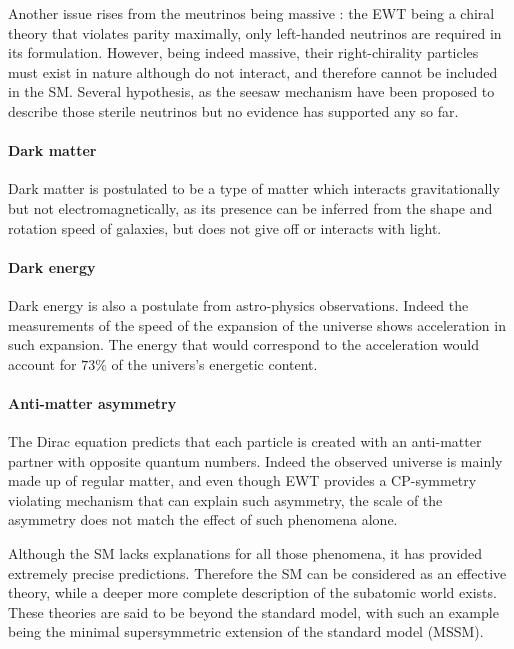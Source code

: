 Another issue rises from the meutrinos being massive : the EWT being a chiral theory that violates parity maximally, only left-handed neutrinos are required in its formulation. However, being indeed massive, their right-chirality particles must exist in nature although do not interact, and therefore cannot be included in the SM. Several hypothesis, as the seesaw mechanism \cite{PhysRevD.22.2227,PhysRevLett.60.1813,PhysRevD.23.165,PhysRevLett.44.912,GellMann:1980vs,MINKOWSKI1977421} have been proposed to describe those sterile neutrinos but no evidence has supported any so far.

\paragraph{Dark matter} Dark matter is postulated to be a type of matter which interacts gravitationally but not electromagnetically, as its presence can be inferred from the shape and rotation speed of galaxies, but does not give off or interacts with light.

\paragraph{Dark energy} Dark energy is also a postulate from astro-physics observations. Indeed the measurements of the speed of the expansion of the universe shows acceleration in such expansion. The energy that would correspond to the acceleration would account for $73\%$ of the univers's energetic content. 

\paragraph{Anti-matter asymmetry} The Dirac equation predicts that each particle is created with an anti-matter partner with opposite quantum numbers. Indeed the observed universe is mainly made up of regular matter, and even though EWT provides a CP-symmetry violating mechanism that can explain such asymmetry, the scale of the asymmetry does not match the effect of such phenomena alone.

Although the SM lacks explanations for all those phenomena, it has provided extremely precise predictions. Therefore the SM can be considered as an effective theory, while a deeper more complete description of the subatomic world exists. These theories are said to be beyond the standard model, with such an example being the minimal supersymmetric extension of the standard model (MSSM).


